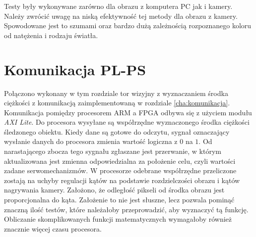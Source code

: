 Testy były wykonywane zarówno dla obrazu z komputera PC jak i kamery. Należy zwrócić uwagę na niską efektywność tej metody dla obrazu z kamery. Spowodowane jest to szumami oraz bardzo dużą zależnością rozpoznanego koloru od natężenia i rodzaju światła.

\section{Komunikacja PL-PS}
\label{komunikacjapl-ps}

Połączono wykonany w tym rozdziale tor wizyjny z wyznaczaniem środka ciężkości z komunikacją zaimplementowaną w rozdziale \ref{cha:komunikacja}. Komunikacja pomiędzy procesorem ARM a FPGA odbywa się z użyciem modułu \textit{AXI Lite}. Do procesora wysyłane są współrzędne wyznaczonego środka ciężkości śledzonego obiektu. Kiedy dane są gotowe do odczytu, sygnał oznaczający wysłanie danych do procesora zmienia wartość logiczna z \(0\) na \(1\). Od narastającego zbocza tego sygnału zgłaszane jest przerwanie, w którym aktualizowana jest zmienna odpowiedzialna za położenie celu, czyli wartości zadane serwomechanizmów. W procesorze odebrane współrzędne przeliczone zostają na uchyby regulacji kątów na podstawie rozdzielczości obrazu i kątów nagrywania kamery. Założono, że odległość pikseli od środka obrazu jest proporcjonalna do kąta. Założenie to nie jest słuszne, lecz pozwala pominąć znaczną ilość testów, które należałoby przeprowadzić, aby wyznaczyć tą funkcję. Obliczanie skomplikowanych funkcji matematycznych wymagałoby również znacznie więcej czasu procesora.